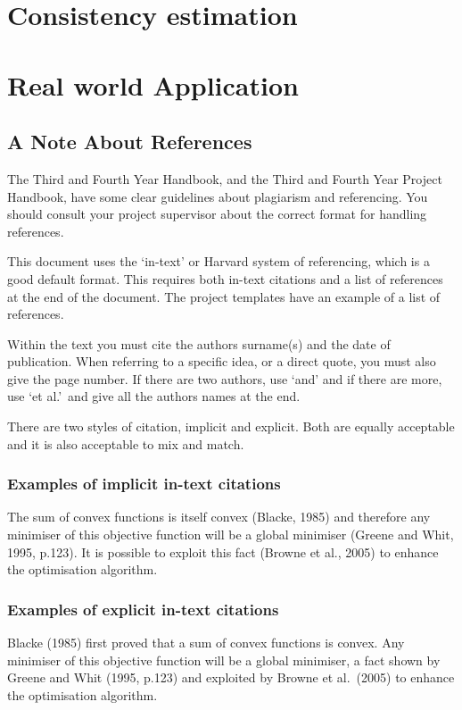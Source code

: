 \documentclass[a4paper, 12pt, notitlepage]{report}
\begin{document}
\chapter{Consistency estimation}
%

\chapter{Real world Application}
\section{A Note About References}
%
The Third and Fourth Year Handbook, and the Third and Fourth Year Project Handbook, have some clear guidelines about plagiarism and referencing.
You should consult your project supervisor about the correct format for handling references.

This document uses the `in-text' or Harvard system of referencing, which is a good default format.
This requires both in-text citations and a list of references at the end of the document.
The project templates have an example of a list of references.

Within the text you must cite the authors surname(s) and the date of publication.
When referring to a specific idea, or a direct quote, you must also give the page number.
If there are two authors, use `and' and if there are more, use `et al.'\ and give all the authors names at the end.

There are two styles of citation, implicit and explicit.
Both are equally acceptable and it is also acceptable to mix and match.

\subsection{Examples of implicit in-text citations}
%
The sum of convex functions is itself convex (Blacke, 1985) and therefore any minimiser of this objective function will be a global minimiser (Greene and Whit, 1995, p.123). It is possible to exploit this fact (Browne et al., 2005) to enhance the optimisation algorithm.

\subsection{Examples of explicit in-text citations}
%
Blacke (1985) first proved that a sum of convex functions is convex. Any minimiser of this objective function will be a global minimiser, a fact shown by Greene and Whit (1995, p.123) and exploited by Browne et al.\ (2005) to enhance the optimisation algorithm.
\end{document}
